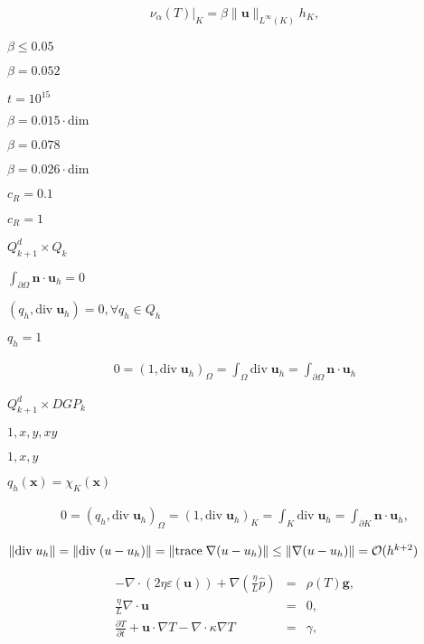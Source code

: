 \documentclass{article}
\begin{document}
\begin{eqnarray*} \nu_\alpha(T)|_K = \beta \|\mathbf{u}\|_{L^\infty(K)} h_K, \end{eqnarray*}
\pagebreak

$\beta \le 0.05$
\pagebreak

$\beta=0.052$
\pagebreak

$t=10^{15}$
\pagebreak

$\beta=0.015\cdot\text{dim}$
\pagebreak

$\beta=0.078$
\pagebreak

$\beta=0.026 \cdot \textrm{dim}$
\pagebreak

$c_R=0.1$
\pagebreak

$c_R=1$
\pagebreak

$Q_{k+1}^d \times Q_k$
\pagebreak

$\int_{\partial\Omega} \mathbf n \cdot \mathbf u_h = 0$
\pagebreak

$(q_h, \textrm{div}\; \mathbf u_h)=0, \forall q_h\in Q_h$
\pagebreak

$q_h=1$
\pagebreak

\begin{align*} 0 = (1, \textrm{div}\; \mathbf u_h)_\Omega = \int_\Omega \textrm{div}\; \mathbf u_h = \int_{\partial\Omega} \mathbf n \cdot \mathbf u_h \end{align*}
\pagebreak

$Q_{k+1}^d \times DGP_k$
\pagebreak

$1, x, y, xy$
\pagebreak

$1,x,y$
\pagebreak

$q_h(\mathbf x)=\chi_K(\mathbf x)$
\pagebreak

\begin{align*} 0 = (q_h, \textrm{div}\; \mathbf u_h)_\Omega = (1, \textrm{div}\; \mathbf u_h)_K = \int_K \textrm{div}\; \mathbf u_h = \int_{\partial K} \mathbf n \cdot \mathbf u_h, \end{align*}
\pagebreak

$\|\textrm{div}\; u_h\|= \|\textrm{div}\; (u-u_h)\|= \|\textrm{trace}\; \nabla (u-u_h)\|\le \|\nabla (u-u_h)\|={\cal O}(h^{k+2})$
\pagebreak

\begin{eqnarray*} -\nabla \cdot (2 \eta \varepsilon ({\mathbf u})) + \nabla \left( \frac{\eta}{L} \hat p\right) &=& \rho(T) \mathbf{g}, \\ \frac{\eta}{L} \nabla \cdot {\mathbf u} &=& 0, \\ \frac{\partial T}{\partial t} + {\mathbf u} \cdot \nabla T - \nabla \cdot \kappa \nabla T &=& \gamma, \end{eqnarray*}
\pagebreak
\end{document}
